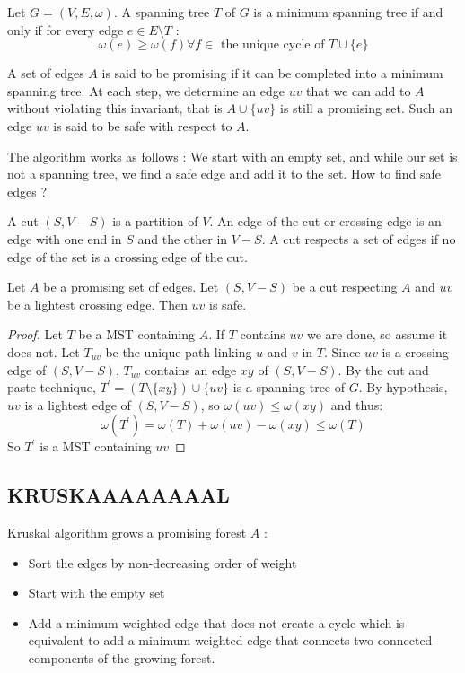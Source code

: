 \documentclass{cours}
\begin{document}
\begin{theorem}
    Let $G = \left(V, E, \omega\right)$. A spanning tree $T$ of $G$ is a minimum spanning tree if and only if for every edge $e \in E \setminus T$ :
    \[
        \omega(e) \geq \omega(f) \forall f \in \text{ the unique cycle of } T \cup \{e\}
    \]
\end{theorem}

\begin{definition}
    A set of edges $A$ is said to be promising if it can be completed into a minimum spanning tree. At each step, we determine an edge $uv$ that we can add to $A$ without violating this invariant, that is $A \cup \{uv\}$ is still a promising set.
    Such an edge $uv$ is said to be safe with respect to $A$.
\end{definition}

The algorithm works as follows : We start with an empty set, and while our set is not a spanning tree, we find a safe edge and add it to the set.
How to find safe edges ?

\begin{definition}
    A cut $\left(S, V - S\right)$ is a partition of $V$. An edge of the cut or crossing edge is an edge with one end in $S$ and the other in $V - S$. A cut respects a set of edges if no edge of the set is a crossing edge of the cut.
\end{definition}

\begin{proposition}
    Let $A$ be a promising set of edges. Let $\left(S, V - S\right)$ be a cut respecting $A$ and $uv$ be a lightest crossing edge. Then $uv$ is safe.
\end{proposition}
\begin{proof}
    Let $T$ be a MST containing $A$. If $T$ contains $uv$ we are done, so assume it does not. Let $T_{uv}$ be the unique path linking $u$ and $v$ in $T$. Since $uv$ is a crossing edge of $(S, V - S)$, $T_{uv}$ contains an edge $xy$ of $(S, V - S)$. By the cut and paste technique, $T^{'} = (T \setminus \{xy\} ) \cup \{uv\}$ is a spanning tree of $G$. By hypothesis, $uv$ is a lightest edge of $(S, V - S)$, so $\omega(uv) \leq \omega(xy)$ and thus: \[\omega(T^{'}) = \omega(T) + \omega(uv) - \omega(xy) \leq \omega(T)\]
    So $T^{'}$ is a MST containing $uv$
\end{proof}

\subsection{KRUSKAAAAAAAAL}
Kruskal algorithm grows a promising forest $A$ :
\begin{itemize}
    \item Sort the edges by non-decreasing order of weight
    \item Start with the empty set
    \item Add a minimum weighted edge that does not create a cycle which is equivalent to add a minimum weighted edge that connects two connected components of the growing forest.
\end{itemize}
\end{document}
